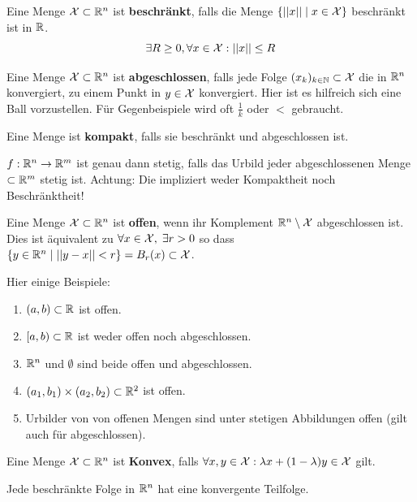 
Eine Menge $\mathcal{X} \subset \mathbb{R}^n$ ist \textbf{beschränkt}, falls die Menge $\{ ||x|| \;|\; x \in \mathcal{X}\}$ beschränkt 
ist in $\mathbb{R}$.
$$\exists R \geq 0, \forall x \in \mathcal{X} : ||x|| \leq R$$

Eine Menge $\mathcal{X} \subset \mathbb{R}^n$ ist \textbf{abgeschlossen}, falls jede Folge $(x_k)_{k \in \mathbb{N}} 
\subset \mathcal{X}$ die in $\mathbb{R}^n$ konvergiert, zu einem Punkt in $y \in \mathcal{X}$ konvergiert. Hier ist es hilfreich sich
eine Ball vorzustellen. Für Gegenbeispiele wird oft $\frac{1}{k}$ oder $<$ gebraucht. \medskip

Eine Menge ist \textbf{kompakt}, falls sie beschränkt und abgeschlossen ist.

\begin{tcolorbox}
    $f: \mathbb{R}^n \to \mathbb{R}^m$ ist genau dann stetig, falls das Urbild jeder abgeschlossenen Menge $\subset \mathbb{R}^m$ stetig ist.
    Achtung: Die impliziert weder Kompaktheit noch Beschränktheit!
\end{tcolorbox}

Eine Menge $\mathcal{X} \subset \mathbb{R}^n$ ist \textbf{offen}, wenn ihr Komplement $\mathbb{R}^n \setminus \mathcal{X}$ abgeschlossen ist.
Dies ist äquivalent zu $\forall x \in \mathcal{X}, \; \exists r > 0$ so dass
$\{y \in \mathbb{R}^n \;|\; ||y - x|| < r\} = B_r(x) \subset \mathcal{X}$. \medskip


\vfill\null
\columnbreak


Hier einige Beispiele:

\begin{enumerate}[label=(\arabic*)]
  \item $(a, b) \subset \mathbb{R}$ ist offen.
  \item $[a, b) \subset \mathbb{R}$ ist weder offen noch abgeschlossen.
  \item $\mathbb{R}^n$ und $\emptyset$ sind beide offen und abgeschlossen.
  \item $(a_1, b_1) \times (a_2, b_2) \subset \mathbb{R}^2$ ist offen.
  \item Urbilder von von offenen Mengen sind unter stetigen Abbildungen offen (gilt auch für abgeschlossen).
\end{enumerate}

Eine Menge $\mathcal{X} \subset \mathbb{R}^n$ ist \textbf{Konvex}, falls $\forall x,y \in \mathcal{X}: \lambda x + (1-\lambda)y \in \mathcal{X}$ gilt.



Jede beschränkte Folge in $\mathbb{R}^n$ hat eine konvergente Teilfolge.


